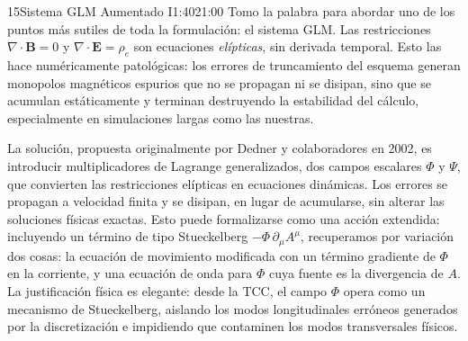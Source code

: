 \documentclass[11pt,a4paper]{article}
\begin{document}
\begin{seborador}{15}{Sistema GLM Aumentado I}{1:40}{21:00}
Tomo la palabra para abordar uno de los puntos más sutiles de toda la
formulación: el sistema GLM. Las restricciones $\nabla\cdot\mathbf{B}=0$ y
$\nabla\cdot\mathbf{E}=\rho_e$ son ecuaciones \emph{elípticas}, sin derivada
temporal. Esto las hace numéricamente patológicas: los errores de
truncamiento del esquema generan monopolos magnéticos espurios que no se
propagan ni se disipan, sino que se acumulan estáticamente y terminan
destruyendo la estabilidad del cálculo, especialmente en simulaciones largas
como las nuestras.

La solución, propuesta originalmente por Dedner y colaboradores en 2002, es
introducir multiplicadores de Lagrange generalizados, dos campos escalares
$\Phi$ y $\Psi$, que convierten las restricciones elípticas en ecuaciones
dinámicas. Los errores se propagan a velocidad finita y se disipan, en lugar
de acumularse, sin alterar las soluciones físicas exactas. Esto puede
formalizarse como una acción extendida: incluyendo un término de tipo
Stueckelberg $-\Phi\,\partial_\mu A^\mu$, recuperamos por variación dos
cosas: la ecuación de movimiento modificada con un término gradiente de
$\Phi$ en la corriente, y una ecuación de onda para $\Phi$ cuya fuente es la
divergencia de $A$. La justificación física es elegante: desde la TCC, el
campo $\Phi$ opera como un mecanismo de Stueckelberg, aislando los modos
longitudinales erróneos generados por la discretización e impidiendo que
contaminen los modos transversales físicos.
\end{seborador}
\end{document}
